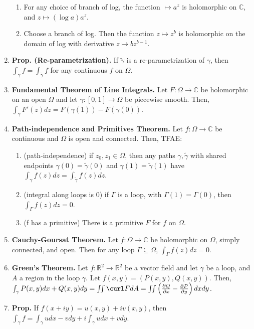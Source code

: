 \begin{enumerate}
\begin{enumerate}
        \item For any choice of branch of log, the function $\mapsto a^z$ is holomorphic on $\mathbb{C}$, and $z \mapsto (\log a) a^z$. 
        \item Choose a branch of log. Then the function $z \mapsto z^b$ is holomorphic on the domain of log with derivative $z \mapsto bz^{b-1}$. 
    \end{enumerate}
    \item \textbf{Prop. (Re-parametrization). } If $\tilde{\gamma}$ is a re-parametrization of $\gamma$, then $\int_{\gamma} f = \int_{\tilde{\gamma}} f$ for any continuous $f$ on $\Omega$. 
    \item \textbf{Fundamental Theorem of Line Integrals. } Let $F: \Omega \to \mathbb{C}$ be holomorphic on an open $\Omega$ and let $\gamma: [0,1] \to \Omega$ be piecewise smooth. Then, $\int_{\gamma} F'(z) dz = F(\gamma(1)) - F(\gamma(0))$. 
    \item \textbf{Path-independence and Primitives Theorem. } Let $f: \Omega \to \mathbb{C}$ be continuous and $\Omega$ is open and connected. Then, TFAE: 
    \begin{enumerate}
        \item (path-independence) if $z_0, z_1 \in \Omega$, then any paths $\gamma, \tilde{\gamma}$ with shared endpoints $\gamma(0) = \tilde{\gamma}(0)$ and $\gamma(1) = \tilde{\gamma}(1)$ have $\int_{\gamma} f(z) dz = \int_{\tilde{\gamma}} f(z) dz$. 
        \item (integral along loops is 0) if $\Gamma$ is a loop, with $\Gamma(1) = \Gamma(0)$, then $\int_{\Gamma} f(z) dz = 0$. 
        \item (f has a primitive) There is a primitive $F$ for $f$ on $\Omega$.  
    \end{enumerate}
    \item \textbf{Cauchy-Goursat Theorem. } Let $f: \Omega \to \mathbb{C}$ be holomorphic on $\Omega$, simply connected, and open. Then for any loop $\Gamma \subseteq \Omega$, $\int_{\Gamma} f(z) dz = 0$. 
    \item \textbf{Green's Theorem. } Let $f: \mathbb{R}^2 \to \mathbb{R}^2$ be a vector field and let $\gamma$ be a loop, and $A$ a region in the loop $\gamma$. Let $f(x,y) = (P(x,y), Q(x,y))$. Then, $\int_{\gamma} P(x,y) dx + Q(x,y) dy = \iint \curl F  dA = \iint \left(\frac{\partial Q}{\partial x} - \frac{\partial P}{\partial y}\right) dxdy$. 
    \item \textbf{Prop. } If $f(x+iy) = u(x,y) + iv(x,y)$, then $\int_{\gamma} f = \int_{\gamma} udx - vdy + i\int_\gamma u dx + vdy$. 

\end{enumerate}
